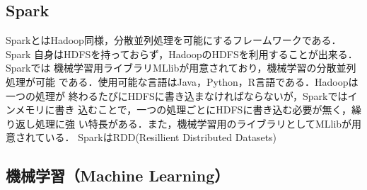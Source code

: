 \documentclass[a4paper,12pt]{jarticle}
\begin{document}
\subsection{Spark}
SparkとはHadoop同様，分散並列処理を可能にするフレームワークである．Spark
自身はHDFSを持っておらず，HadoopのHDFSを利用することが出来る．Sparkでは
機械学習用ライブラリMLlibが用意されており，機械学習の分散並列処理が可能
である．使用可能な言語はJava，Python，R言語である．Hadoopは一つの処理が
終わるたびにHDFSに書き込まなければならないが，Sparkではインメモリに書き
込むことで，一つの処理ごとにHDFSに書き込む必要が無く，繰り返し処理に強
い特長がある．また，機械学習用のライブラリとしてMLlibが用意されている．
SparkはRDD(Resillient Distributed Datasets)


%
%
\subsection{機械学習（Machine Learning）}

\end{document}
